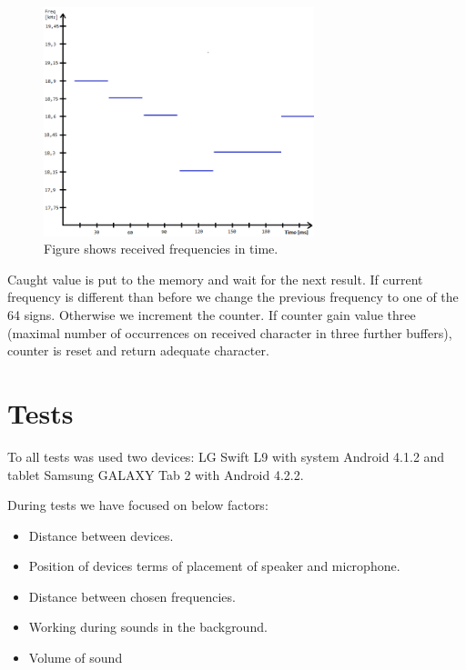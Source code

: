 \documentclass[11pt,titlepage]{article}
\theoremstyle{plain}
\begin{document}
\begin{figure}[H]
	\centering
	\includegraphics[width=0.70\textwidth]{img/receiving}
	\caption{Figure shows received frequencies in time.}
\end{figure}

Caught value is put to the memory and wait for the next result. If current frequency is different than before we change the previous frequency to one of the 64 signs. Otherwise we increment the counter. If counter gain value three (maximal number of occurrences on received character in three further buffers), counter is reset and return adequate character.


\section{Tests}
To all tests was used two devices: LG Swift L9 with system Android 4.1.2 and tablet Samsung GALAXY Tab 2 with Android 4.2.2. 

During tests we have focused on below factors:
\begin{itemize}
\item Distance between devices.
\item Position of devices terms of placement of speaker and microphone.
\item Distance between chosen frequencies.
\item Working during sounds in the background.
\item Volume of sound
\end{itemize}
\end{document}
